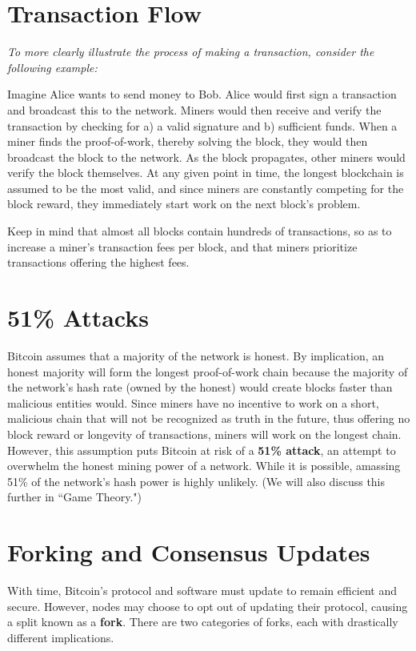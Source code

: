 \documentclass[11pt]{article}
\begin{document}
   \section*{Transaction Flow}
   
   \textit{To more clearly illustrate the process of making a transaction, consider the following example:}
   
   Imagine Alice wants to send money to Bob. Alice would first sign a transaction and broadcast this to the network. Miners would then receive and verify the transaction by checking for a) a valid signature and b) sufficient funds. When a miner finds the proof-of-work, thereby solving the block, they would then broadcast the block to the network. As the block propagates, other miners would verify the block themselves. At any given point in time, the longest blockchain is assumed to be the most valid, and since miners are constantly competing for the block reward, they immediately start work on the next block's problem.
   
   Keep in mind that almost all blocks contain hundreds of transactions, so as to increase a miner's transaction fees per block, and that miners prioritize transactions offering the highest fees.
   
   \section*{51\% Attacks}
   
   Bitcoin assumes that a majority of the network is honest. By implication, an honest majority will form the longest proof-of-work chain because the majority of the network's hash rate (owned by the honest) would create blocks faster than malicious entities would. Since miners have no incentive to work on a short, malicious chain that will not be recognized as truth in the future, thus offering no block reward or longevity of transactions, miners will work on the longest chain. However, this assumption puts Bitcoin at risk of a \textbf{51\% attack}, an attempt to overwhelm the honest mining power of a network. While it is possible, amassing 51\% of the network's hash power is highly unlikely. (We will also discuss this further in ``Game Theory.")
   
   \section*{Forking and Consensus Updates}
   
   With time, Bitcoin's protocol and software must update to remain efficient and secure. However, nodes may choose to opt out of updating their protocol, causing a split known as a \textbf{fork}. There are two categories of forks, each with drastically different implications.
   
\end{document}
